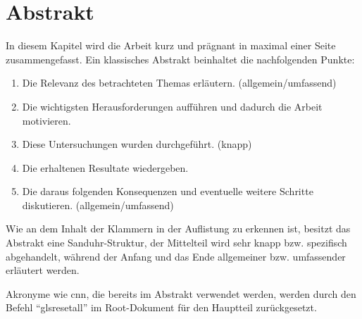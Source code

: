 \chapter*{Abstrakt} %

In diesem Kapitel wird die Arbeit kurz und prägnant in maximal einer Seite zusammengefasst.
Ein klassisches Abstrakt beinhaltet die nachfolgenden Punkte:
\begin{enumerate}
	\setlength{\itemsep}{0pt}
	\item Die Relevanz des betrachteten Themas erläutern. (allgemein/umfassend)
	\item Die wichtigsten Herausforderungen aufführen und dadurch die Arbeit motivieren.
	\item Diese Untersuchungen wurden durchgeführt. (knapp)
	\item Die erhaltenen Resultate wiedergeben.
	\item Die daraus folgenden Konsequenzen und eventuelle weitere Schritte diskutieren. (allgemein/umfassend)
\end{enumerate}
Wie an dem Inhalt der Klammern in der Auflistung zu erkennen ist, besitzt das Abstrakt eine Sanduhr-Struktur, \ie{} der Mittelteil wird sehr knapp bzw. spezifisch abgehandelt, während der Anfang und das Ende allgemeiner bzw. umfassender erläutert werden.

Akronyme wie \zB{} \gls{cnn}, die bereits im Abstrakt verwendet werden, werden durch den Befehl \enquote{glsresetall} im Root-Dokument für den Hauptteil zurückgesetzt.
